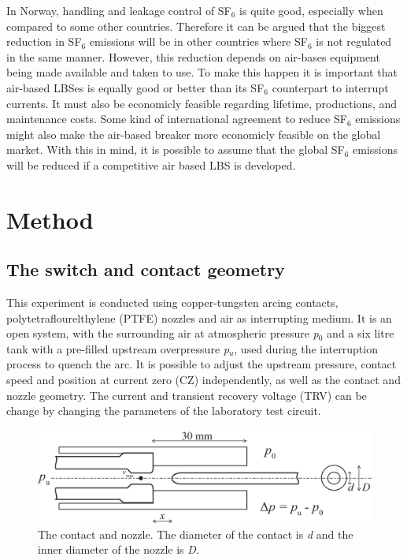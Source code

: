 \documentclass[10pt,a4paper,twoside]{article}
\begin{document}
In Norway, handling and leakage control of SF$_6$ is quite good, especially when compared to some other countries. Therefore it can be argued that the biggest reduction in SF$_6$ emissions will be in other countries where SF$_6$ is not regulated in the same manner. However, this reduction depends on air-bases equipment being made available and taken to use. To make this happen it is important that air-based LBSes is equally good or better than its SF$_6$ counterpart to interrupt currents. It must also be economicly feasible regarding lifetime, productions, and maintenance costs. Some kind of international agreement to reduce SF$_6$ emissions might also make the air-based breaker more economicly feasible on the global market. With this in mind, it is possible to assume that the global SF$_6$ emissions will be reduced if a competitive air based LBS is developed.

\cleardoublepage

\section{Method} \label{sec:Method}

\subsection{The switch and contact geometry} \label{sec:switchAndContactGeo}

This experiment is conducted using copper-tungsten arcing contacts, polytetraflourelthylene (PTFE) nozzles and air as interrupting medium. It is an open system, with the surrounding air at atmospheric pressure \textit{p$_0$} and a six litre tank with a pre-filled upstream overpressure \textit{p$_u$}, used during the interruption process to quench the arc. It is possible to adjust the upstream pressure, contact speed and position at current zero (CZ) independently, as well as the contact and nozzle geometry. The current and transient recovery voltage (TRV) can be change by changing the parameters of the laboratory test circuit.

\begin{figure} [h]
\centering
\includegraphics[scale=0.3]{Bilder/Method/contactSetUpVmax3.png}
\caption{The contact and nozzle. The diameter of the contact is \textit{d} and the inner diameter of the nozzle is \textit{D}.} \label{fig:contactAndNozzle}
\end{figure}
\end{document}
